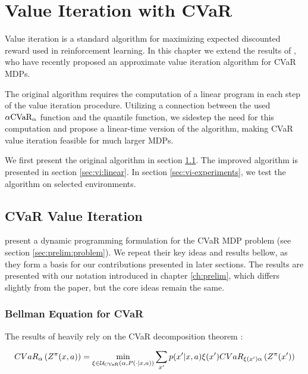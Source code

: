 \chapter{Value Iteration with CVaR}\label{ch:vi}

Value iteration is a standard algorithm for maximizing expected discounted reward used in reinforcement learning. In this chapter we extend the results of \citet{chow2015risk}, who have recently proposed an approximate value iteration algorithm for CVaR MDPs. 

The original algorithm requires the computation of a linear program in each step of the value iteration procedure. Utilizing a connection between the used $\alpha \text{CVaR}_\alpha$ function and the quantile function, we sidestep the need for this computation and propose a linear-time version of the algorithm, making CVaR value iteration feasible for much larger MDPs. 

We first present the original algorithm in section \ref{sec:vi:cvar}. The improved algorithm is presented in section \ref{sec:vi:linear}. In section \ref{sec:vi-experiments}, we test the algorithm on selected environments.


\section{CVaR Value Iteration}\label{sec:vi:cvar}

\citet{chow2015risk} present a dynamic programming formulation for the CVaR MDP problem (see section \ref{sec:prelim:problem}).  We repeat their key ideas and results bellow, as they form a basis for our contributions presented in later sections. The results are presented with our notation introduced in chapter \ref{ch:prelim}, which differs slightly from the paper, but the core ideas remain the same.

\subsection{Bellman Equation for CVaR}

The results of \citet{chow2015risk} heavily rely on the CVaR decomposition theorem \cite{decomp}:


\begin{equation}\label{eq:vi:cvardecomp}
CVaR_\alpha\left( {Z^\pi(x, a)} \right) = \min_{\xi \in \mathcal{U}_{\text{CVaR}}(\alpha, P(\cdot | x, a))} \sum_{x'} p(x'| x, a)\xi(x') CVaR_{\xi(x')\alpha}\left( {Z^\pi(x')} \right)
\end{equation}

